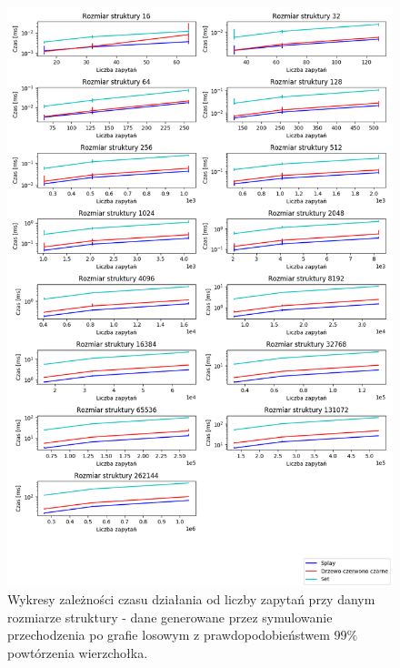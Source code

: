 \documentclass[declaration,shortabstract]{iithesis}
\theoremstyle{thm}
\theoremstyle{remark}
\theoremstyle{plain}
\theoremstyle{plain}
\theoremstyle{plain}
\begin{document}
\begin{figure}[H]  
\centering
    \includegraphics[scale=0.5]{wykresy3/randwalk1.png}
      \caption{Wykresy zależności czasu działania od liczby zapytań przy danym rozmiarze struktury - dane generowane przez symulowanie przechodzenia po grafie losowym z prawdopodobieństwem  \(99\%\) powtórzenia wierzchołka. }  
\end{figure}
\end{document}
